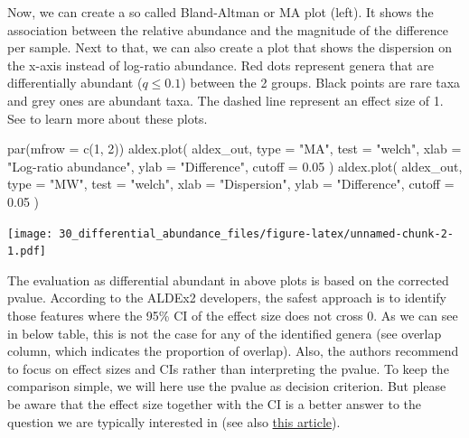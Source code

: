 \documentclass[
]{book}
\newenvironment{Shaded}{\begin{snugshade}}{\end{snugshade}}
\newcommand{\AttributeTok}[1]{\textcolor[rgb]{0.77,0.63,0.00}{#1}}
\newcommand{\DecValTok}[1]{\textcolor[rgb]{0.00,0.00,0.81}{#1}}
\newcommand{\FloatTok}[1]{\textcolor[rgb]{0.00,0.00,0.81}{#1}}
\newcommand{\FunctionTok}[1]{\textcolor[rgb]{0.00,0.00,0.00}{#1}}
\newcommand{\NormalTok}[1]{#1}
\newcommand{\StringTok}[1]{\textcolor[rgb]{0.31,0.60,0.02}{#1}}
\begin{document}
Now, we can create a so called Bland-Altman or MA plot (left). It shows the
association between the relative abundance and the magnitude of the difference
per sample. Next to that, we can also create a plot that shows the dispersion
on the x-axis instead of log-ratio abundance. Red dots represent genera that are
differentially abundant (\(q \leq 0.1\)) between the 2 groups. Black points are
rare taxa and grey ones are abundant taxa. The dashed line represent an effect
size of 1. See \citet{Gloor2016} to learn more about these plots.

\begin{Shaded}
\begin{Highlighting}[]
\FunctionTok{par}\NormalTok{(}\AttributeTok{mfrow =} \FunctionTok{c}\NormalTok{(}\DecValTok{1}\NormalTok{, }\DecValTok{2}\NormalTok{))}
  \FunctionTok{aldex.plot}\NormalTok{(}
\NormalTok{    aldex\_out, }
    \AttributeTok{type =} \StringTok{"MA"}\NormalTok{, }
    \AttributeTok{test =} \StringTok{"welch"}\NormalTok{, }
    \AttributeTok{xlab =} \StringTok{"Log{-}ratio abundance"}\NormalTok{,}
    \AttributeTok{ylab =} \StringTok{"Difference"}\NormalTok{,}
    \AttributeTok{cutoff =} \FloatTok{0.05}
\NormalTok{  )}
  \FunctionTok{aldex.plot}\NormalTok{(}
\NormalTok{    aldex\_out, }
    \AttributeTok{type =} \StringTok{"MW"}\NormalTok{, }
    \AttributeTok{test =} \StringTok{"welch"}\NormalTok{,}
    \AttributeTok{xlab =} \StringTok{"Dispersion"}\NormalTok{,}
    \AttributeTok{ylab =} \StringTok{"Difference"}\NormalTok{,}
    \AttributeTok{cutoff =} \FloatTok{0.05}
\NormalTok{  )}
\end{Highlighting}
\end{Shaded}

\texttt{[image: 30\_differential\_abundance\_files/figure-latex/unnamed-chunk-2-1.pdf]}

The evaluation as differential abundant in above plots is based on the
corrected pvalue. According to the ALDEx2 developers, the safest
approach is to identify those features where the 95\% CI of the effect
size does not cross 0. As we can see in below table, this is not the
case for any of the identified genera (see overlap column, which
indicates the proportion of overlap). Also, the authors recommend to
focus on effect sizes and CIs rather than interpreting the pvalue. To
keep the comparison simple, we will here use the pvalue as decision
criterion. But please be aware that the effect size together with the
CI is a better answer to the question we are typically interested in
(see also \href{https://www.nature.com/articles/d41586-019-00857-9}{this
article}).
\end{document}
